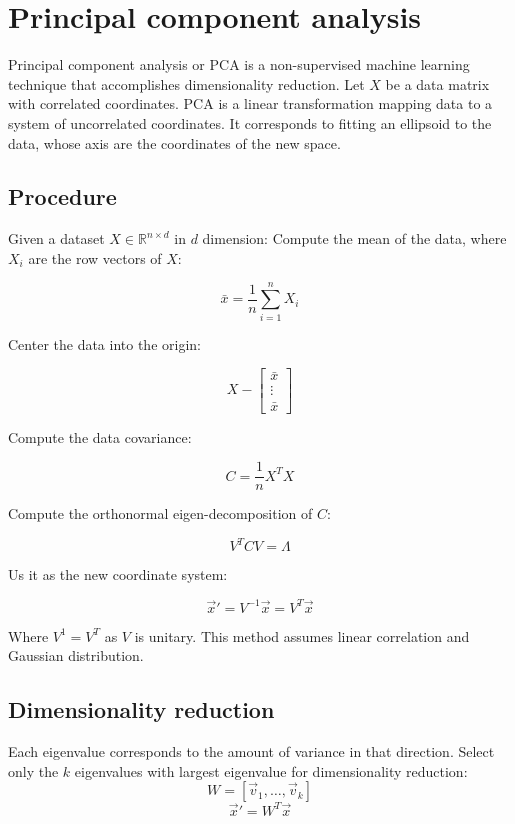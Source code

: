 \section{Principal component analysis}
Principal component analysis or PCA is a non-supervised machine learning technique that accomplishes dimensionality reduction.
Let $X$ be a data matrix with correlated coordinates.
PCA is a linear transformation mapping data to a system of uncorrelated coordinates.
It corresponds to fitting an ellipsoid to the data, whose axis are the coordinates of the new space.

	\subsection{Procedure}
	Given a dataset $X\in\mathbb{R}^{n\times d}$ in $d$ dimension:
	Compute the mean of the data, where $X_i$ are the row vectors of $X$:

	$$\bar{x} = \frac{1}{n}\sum\limits_{i=1}^nX_i$$

	Center the data into the origin:

	$$X - \begin{bmatrix}\bar{x}\\\vdots\\\bar{x}\end{bmatrix}$$

	Compute the data covariance:

	$$C = \frac{1}{n}X^TX$$

	Compute the orthonormal eigen-decomposition of $C$:

	$$V^TCV=\Lambda$$

	Us it as the new coordinate system:

	$$\vec{x}' = V^{-1}\vec{x} = V^T\vec{x}$$

	Where $V^1=V^T$ as $V$ is unitary.
	This method assumes linear correlation and Gaussian distribution.

	\subsection{Dimensionality reduction}
	Each eigenvalue corresponds to the amount of variance in that direction.
	Select only the $k$ eigenvalues with largest eigenvalue for dimensionality reduction:
	$$W = [\vec{v}_1, \dots, \vec{v}_k]$$
	$$\vec{x}' = W^T\vec{x}$$
